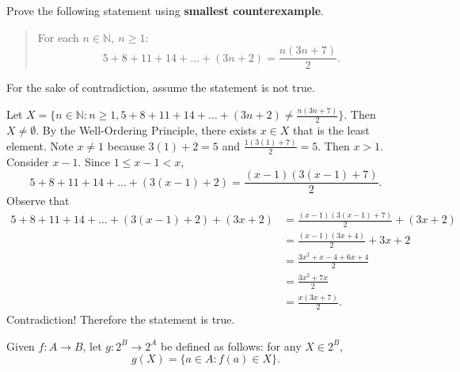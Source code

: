 \documentclass[10pt, addpoints]{exam}
\theoremstyle{definition}
\newcommand{\N}{\mathbb{N}}
\begin{document}
\begin{questions}
\begin{parts}
\end{parts}

\newpage
\question[8] Prove the following statement using \textbf{smallest counterexample}.
\begin{quotation}
For each $n \in \N, \ n \geq 1$:
\[ 5 + 8 + 11 + 14 + \ldots + (3n+2) = \frac{n(3n+7)}{2}. \]

\end{quotation}

\begin{solution}
For the sake of contradiction, assume the statement is not true.

Let $X=\{n\in \N : n\geq 1, 5 + 8 + 11 + 14 + \ldots + (3n+2) \neq \frac{n(3n+7)}{2}\}.$ Then $X\neq \emptyset$. By the Well-Ordering Principle, there exists $x\in X$ that is the least element. Note $x\neq 1$ because $3(1)+2 = 5$ and $\frac{1(3(1)+7)}{2} = 5$. Then $x>1$. Consider $x-1$. Since $1\leq x-1 <x$, 
\[ 5 + 8 + 11 + 14 + \ldots + (3(x-1)+2) = \frac{(x-1)(3(x-1)+7)}{2}. 
\]
Observe that 
\begin{align*}
 5 + 8 + 11 + 14 + \ldots + (3(x-1)+2)  + (3x+2) & = \frac{(x-1)(3(x-1)+7)}{2} + (3x+2)\\
 & = \frac{(x-1)(3x+4)}{2} + 3x+2 \\
 & = \frac{3x^2+x-4+6x+4}{2}\\ 
 &= \frac{3x^2+7x}{2}\\
 &= \frac{x(3x+7)}{2}.
\end{align*}
Contradiction! Therefore the statement is true.
\end{solution}


\newpage
\question Given $f:A\to B$, let $g:2^B\to 2^A$ be defined as follows: for any $X\in 2^B$, 
\[ g(X)=\{a\in A: f(a)\in X\}.\]
\end{questions}
\end{document}
